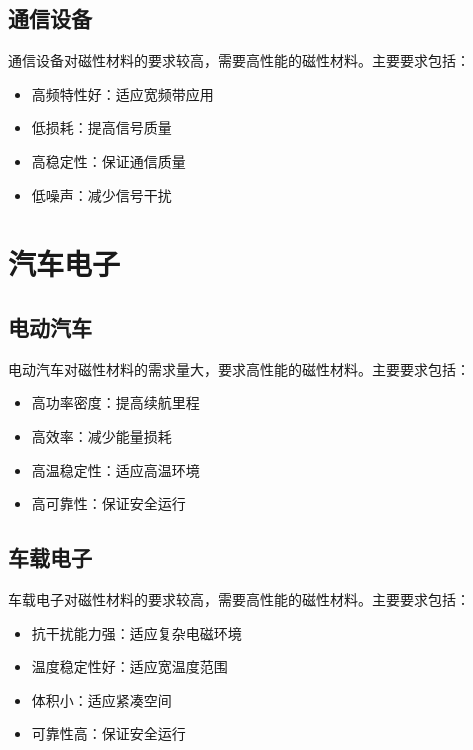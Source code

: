 \documentclass[12pt,UTF8]{ctexbook}
\begin{document}
\subsection{通信设备}

通信设备对磁性材料的要求较高，需要高性能的磁性材料。主要要求包括：

\begin{itemize}[leftmargin=2cm]
    \item 高频特性好：适应宽频带应用
    \item 低损耗：提高信号质量
    \item 高稳定性：保证通信质量
    \item 低噪声：减少信号干扰
\end{itemize}

\section{汽车电子}

\subsection{电动汽车}

电动汽车对磁性材料的需求量大，要求高性能的磁性材料。主要要求包括：

\begin{itemize}[leftmargin=2cm]
    \item 高功率密度：提高续航里程
    \item 高效率：减少能量损耗
    \item 高温稳定性：适应高温环境
    \item 高可靠性：保证安全运行
\end{itemize}

\subsection{车载电子}

车载电子对磁性材料的要求较高，需要高性能的磁性材料。主要要求包括：

\begin{itemize}[leftmargin=2cm]
    \item 抗干扰能力强：适应复杂电磁环境
    \item 温度稳定性好：适应宽温度范围
    \item 体积小：适应紧凑空间
    \item 可靠性高：保证安全运行
\end{itemize}
\end{document}

